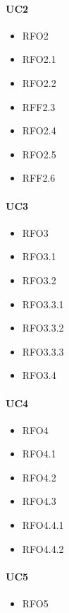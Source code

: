 \paragraph{UC2}
\quad
\begin{multicols}{3}
    \begin{itemize}
        \item RFO2
        \item RFO2.1
        \item RFO2.2
        \item RFF2.3
        \item RFO2.4
        \item RFO2.5
        \item RFF2.6
    \end{itemize}
\end{multicols}

\paragraph{UC3}
\quad
\begin{multicols}{3}
    \begin{itemize}
        \item RFO3
        \item RFO3.1
        \item RFO3.2
        \item RFO3.3.1
        \item RFO3.3.2
        \item RFO3.3.3
        \item RFO3.4
    \end{itemize}
\end{multicols}

\paragraph{UC4}
\quad
\begin{multicols}{3}
    \begin{itemize}
        \item RFO4
        \item RFO4.1
        \item RFO4.2
        \item RFO4.3
        \item RFO4.4.1
        \item RFO4.4.2
    \end{itemize}
\end{multicols}

\paragraph{UC5}
\quad
\begin{multicols}{3}
    \begin{itemize}
        \item RFO5
    \end{itemize}
\end{multicols}

